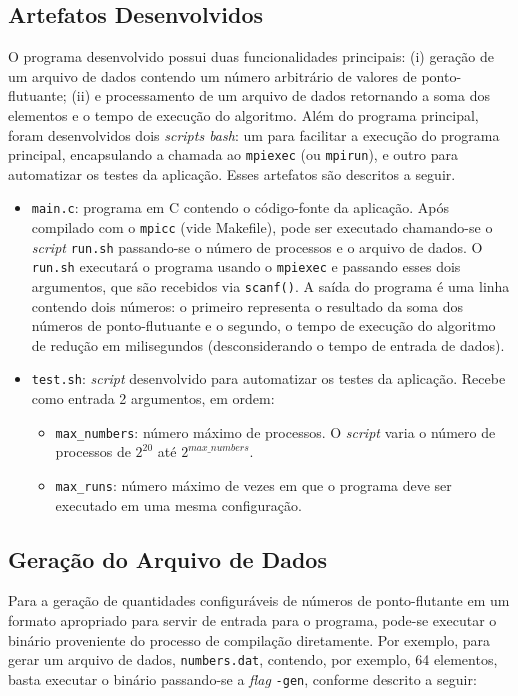 \documentclass[12pt,a4paper]{article}
\begin{document}
\subsection{Artefatos Desenvolvidos}
O programa desenvolvido possui duas funcionalidades principais: (i) geração de
um arquivo de dados contendo um número arbitrário de valores de ponto-flutuante;
(ii) e processamento de um arquivo de dados retornando a soma dos elementos e o
tempo de execução do algoritmo. Além do programa principal, foram desenvolvidos
dois \textit{scripts bash}: um para facilitar a execução do programa principal,
encapsulando a chamada ao \texttt{mpiexec} (ou \texttt{mpirun}), e outro para
automatizar os testes da aplicação. Esses artefatos são descritos a seguir.

\begin{itemize}
    \item \texttt{main.c}: programa em C contendo o código-fonte da aplicação.
        Após compilado com o \texttt{mpicc} (vide Makefile), pode ser executado
        chamando-se o \textit{script} \texttt{run.sh} passando-se o número de
        processos e o arquivo de dados. O \texttt{run.sh} executará o programa
        usando o \texttt{mpiexec} e passando esses dois argumentos, que são
        recebidos via \texttt{scanf()}. A saída do programa é uma linha contendo
        dois números: o primeiro representa o resultado da soma dos números de
        ponto-flutuante e o segundo, o tempo de execução do algoritmo de redução
        em milisegundos (desconsiderando o tempo de entrada de dados).
	\item \texttt{test.sh}: \textit{script} desenvolvido para automatizar os
		testes da aplicação. Recebe como entrada 2 argumentos, em ordem:
		\begin{itemize}
			\item \texttt{max\_numbers}: número máximo de processos. O
				\textit{script} varia o número de processos de $2^{20}$ até
				$2^{max\_numbers}$.
			\item \texttt{max\_runs}: número máximo de vezes em que o programa
				deve ser executado em uma mesma configuração.
		\end{itemize}
\end{itemize}


\subsection{Geração do Arquivo de Dados}
\label{sec:data-gen}
Para a geração de quantidades configuráveis de números de ponto-flutante em um
formato apropriado para servir de entrada para o programa, pode-se executar o
binário proveniente do processo de compilação diretamente. Por exemplo, para
gerar um arquivo de dados, \texttt{numbers.dat}, contendo, por exemplo, 64
elementos, basta executar o binário passando-se a \textit{flag} \texttt{-gen},
conforme descrito a seguir:
\end{document}
